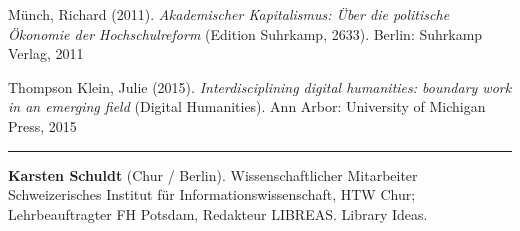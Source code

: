 \documentclass[a4paper,
fontsize=11pt,
oneside,
numbers=noperiodatend,
parskip=half-,
bibliography=totoc,
final
]{scrartcl}
\begin{document}
Münch, Richard (2011). \emph{Akademischer Kapitalismus: Über die
politische Ökonomie der Hochschulreform} (Edition Suhrkamp, 2633).
Berlin: Suhrkamp Verlag, 2011

Thompson Klein, Julie (2015). \emph{Interdisciplining digital
humanities: boundary work in an emerging field} (Digital Humanities).
Ann Arbor: University of Michigan Press, 2015

\begin{center}\rule{0.5\linewidth}{\linethickness}\end{center}

\textbf{Karsten Schuldt} (Chur / Berlin). Wissenschaftlicher Mitarbeiter
Schweizerisches Institut für Informationswissenschaft, HTW Chur;
Lehrbeauftragter FH Potsdam, Redakteur LIBREAS. Library Ideas.
\end{document}
